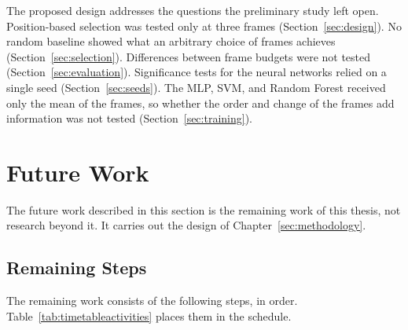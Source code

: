 The proposed design addresses the questions the preliminary study left open. Position-based selection was tested only at three frames (Section~\ref{sec:design}). No random baseline showed what an arbitrary choice of frames achieves (Section~\ref{sec:selection}). Differences between frame budgets were not tested (Section~\ref{sec:evaluation}). Significance tests for the neural networks relied on a single seed (Section~\ref{sec:seeds}). The MLP, SVM, and Random Forest received only the mean of the frames, so whether the order and change of the frames add information was not tested (Section~\ref{sec:training}).



\section{Future Work}
\label{sec:future}

The future work described in this section is the remaining work of this thesis, not research beyond it. It carries out the design of Chapter~\ref{sec:methodology}.

\subsection{Remaining Steps}
\label{sec:steps}

The remaining work consists of the following steps, in order. Table~\ref{tab:timetableactivities} places them in the schedule.

